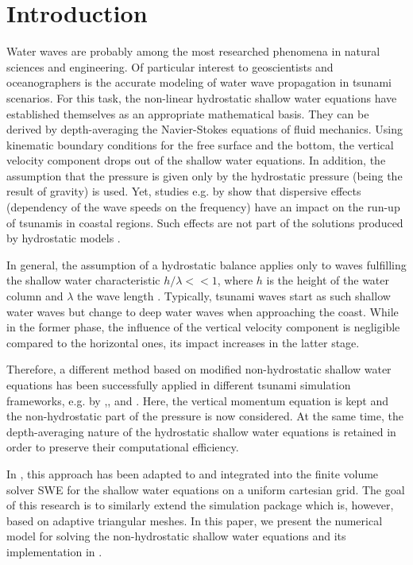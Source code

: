 
\section{Introduction}

Water waves are probably among the most researched phenomena in natural sciences and engineering. Of particular interest to geoscientists and oceanographers is the accurate modeling of water wave propagation in tsunami scenarios. For this task, the non-linear hydrostatic shallow water equations have established themselves as an appropriate mathematical basis. They can be derived by depth-averaging the Navier-Stokes equations of fluid mechanics. Using kinematic boundary conditions for the free surface and the bottom, the vertical velocity component drops out of the shallow water equations. In addition, the assumption that the pressure is given only by the hydrostatic pressure (being the result of gravity) is used. Yet, studies e.g. by \cite{horrillo} show that dispersive effects (dependency of the wave speeds on the frequency) have an impact on the run-up of tsunamis in coastal regions. Such effects are not part of the solutions produced by hydrostatic models \cite{horrillo}. 

In general, the assumption of a hydrostatic balance applies only to waves fulfilling the shallow water characteristic $h/\lambda <<1$, where $h$ is the height of the water column and $\lambda$ the wave length \cite{fuchs}. Typically, tsunami waves start as such shallow water waves but change to deep water waves when approaching the coast. While in the former phase, the influence of the vertical velocity component is negligible compared to the horizontal ones, its impact increases in the latter stage.

Therefore, a different method based on modified non-hydrostatic shallow water equations has been successfully applied in different tsunami simulation frameworks, e.g. by \cite{fuchs},\cite{cui},\cite{walters} and \cite{stelling2003accurate}. Here, the vertical momentum equation is kept and the non-hydrostatic part of the pressure is now considered. At the same time, the depth-averaging nature of the hydrostatic shallow water equations is retained in order to preserve their computational efficiency. 

In \cite{samfass14extension}, this approach has been adapted to and integrated into the finite volume solver SWE for the shallow water equations on a uniform cartesian grid. The goal of this research is to similarly extend the simulation package \samoa which is, however, based on adaptive triangular meshes. In this paper, we present the numerical model for solving the non-hydrostatic shallow water equations and its implementation in \samoa.

